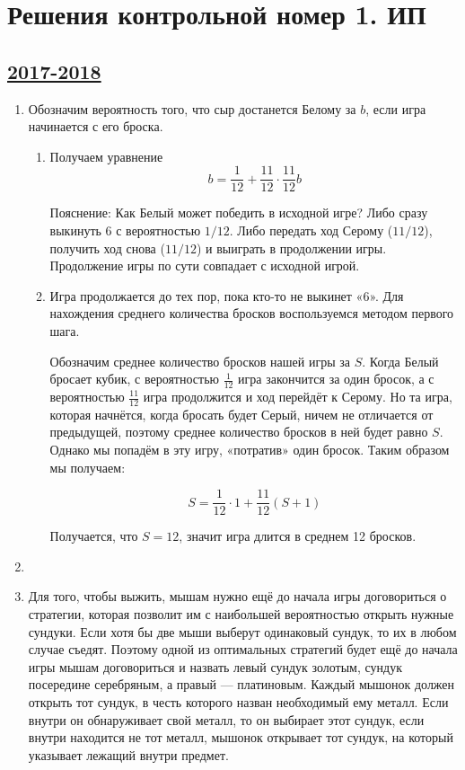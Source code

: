 \thispagestyle{empty}
\section{Решения контрольной номер 1. ИП}

\subsection[2017-2018]{\hyperref[sec:kr_01_ip_2017_2018]{2017-2018}}
\label{sec:sol_kr_01_ip_2017_2018}

\begin{enumerate}
\item Обозначим вероятность того, что сыр достанется Белому за $b$, если игра
начинается с его броска.

\begin{enumerate}
\item Получаем уравнение
\[
b = \frac{1}{12} + \frac{11}{12} \cdot \frac{11}{12} b
\]

Пояснение: Как Белый может победить в исходной игре? Либо сразу выкинуть 6 с вероятностью $1/12$.
Либо передать ход Серому ($11/12$), получить ход снова ($11/12$) и выиграть в продолжении игры.
Продолжение игры по сути совпадает с исходной игрой.

\item Игра продолжается до тех пор, пока кто-то не выкинет «6».
Для нахождения среднего количества бросков воспользуемся методом первого шага.

Обозначим среднее количество бросков нашей игры за $S$.
Когда Белый бросает кубик, с вероятностью $\frac{1}{12}$ игра закончится за один бросок,
а с вероятностью $\frac{11}{12}$ игра продолжится и ход перейдёт к Серому.
Но та игра, которая начнётся, когда бросать будет Серый, ничем не отличается от предыдущей,
поэтому среднее количество бросков в ней будет равно $S$.
Однако мы попадём в эту игру, «потратив» один бросок. Таким образом мы получаем:

\[
S = \frac{1}{12} \cdot 1 + \frac{11}{12}(S +1)
\]

Получается, что $S = 12$, значит игра длится в среднем 12 бросков.
\end{enumerate}

\item

\item Для того, чтобы выжить, мышам нужно ещё до начала игры договориться о стратегии,
которая позволит им с наибольшей вероятностью открыть нужные сундуки.
Если хотя бы две мыши выберут одинаковый сундук, то их в любом случае съедят.
Поэтому одной из оптимальных стратегий будет ещё до начала игры мышам договориться
и назвать левый сундук золотым, сундук посередине серебряным, а правый — платиновым.
Каждый мышонок должен открыть тот сундук, в честь которого назван необходимый ему металл.
Если внутри он обнаруживает свой металл, то он выбирает этот сундук,
если внутри находится не тот металл, мышонок открывает тот сундук,
на который указывает лежащий внутри предмет.


\end{enumerate}
